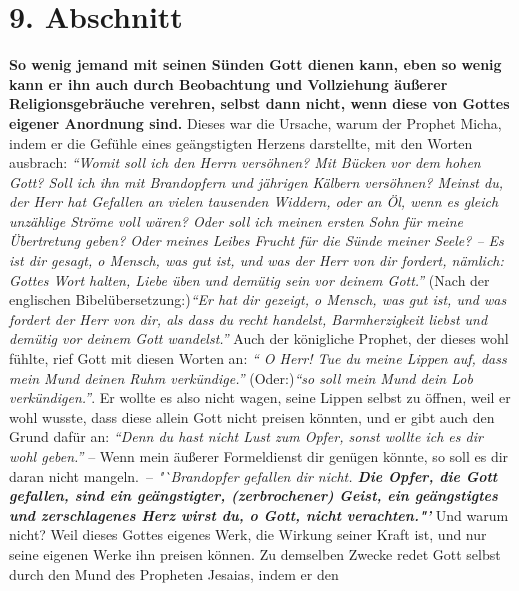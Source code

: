\section{9. Abschnitt} \label{kap6_ab9}

\label{ref:06_09_gottesregeln}
\textbf{So wenig jemand mit seinen Sünden Gott dienen kann, eben so wenig kann
er ihn
auch durch Beobachtung und Vollziehung äußerer Religionsgebräuche verehren,
selbst dann nicht, wenn diese von Gottes eigener Anordnung sind.}
Dieses war die
Ursache, warum der Prophet Micha, indem er die Gefühle
eines geängstigten
Herzens darstellte, mit den Worten ausbrach:
\textit{"`Womit soll ich den Herrn versöhnen? Mit Bücken vor dem hohen Gott?
Soll ich ihn mit Brandopfern und jährigen Kälbern versöhnen? Meinst du, der
Herr hat Gefallen an vielen tausenden Widdern, oder an Öl, wenn es gleich
unzählige Ströme voll wären? Oder soll ich meinen ersten Sohn für meine
Übertretung geben? Oder meines Leibes Frucht für die Sünde meiner Seele? -- Es
ist dir gesagt, o Mensch, was gut ist, und was der Herr von dir fordert,
nämlich: Gottes Wort halten, Liebe üben und demütig sein vor deinem Gott."'}
(Nach der englischen Bibelübersetzung:)\textit{"`Er hat dir gezeigt,
o Mensch, was gut ist, und was fordert der Herr von dir, als dass du recht
handelst, Barmherzigkeit liebst und demütig vor deinem Gott
wandelst."'}
Auch der königliche Prophet, der dieses
wohl fühlte, rief Gott mit diesen Worten an:
\textit{"` O Herr! Tue du meine Lippen auf,
dass mein Mund deinen Ruhm verkündige."'} (Oder:)\textit{"`so soll mein Mund
dein Lob
verkündigen."'}.
Er wollte es also nicht wagen,
seine Lippen selbst zu öffnen, weil er wohl wusste, dass diese allein Gott
nicht preisen könnten, und er gibt auch den Grund dafür an:
\textit{"`Denn du hast
nicht Lust zum Opfer, sonst wollte ich es dir wohl geben."'} -- Wenn mein
äußerer Formeldienst dir genügen könnte, so soll es dir daran nicht mangeln.~-- \textit{"`Brandopfer gefallen dir nicht. \textbf{Die Opfer,
die Gott gefallen, sind ein geängstigter, (zerbrochener) Geist, ein
geängstigtes und zerschlagenes Herz wirst du, o Gott, nicht
verachten."'}}
Und warum
nicht? Weil dieses Gottes eigenes Werk, die Wirkung seiner Kraft ist, und nur
seine eigenen Werke ihn preisen können. Zu demselben Zwecke redet Gott selbst
durch den Mund des Propheten Jesaias, indem er den

